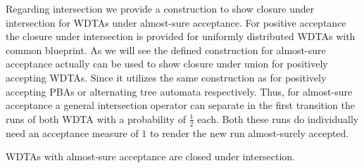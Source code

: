 Regarding intersection we provide a construction to show closure under 
intersection for \acp{WDTA} under almost-sure acceptance. For positive 
acceptance the closure under intersection is provided for uniformly distributed
\acp{WDTA} with common blueprint. As we will see the defined construction for
almost-sure acceptance actually can be used to show closure under union for
positively accepting \acp{WDTA}. Since it utilizes the same construction as for
positively accepting \acp{PBA} or alternating tree automata respectively.
Thus, for almost-sure acceptance a general intersection operator can separate
in the first transition the runs of both \ac{WDTA} with a probability of
$\frac{1}{2}$ each. Both these runs do individually need an acceptance measure 
of $1$ to render the new run almost-surely accepted.
\begin{proposition}
  \acp{WDTA} with almost-sure acceptance are closed under intersection.
\end{proposition}
